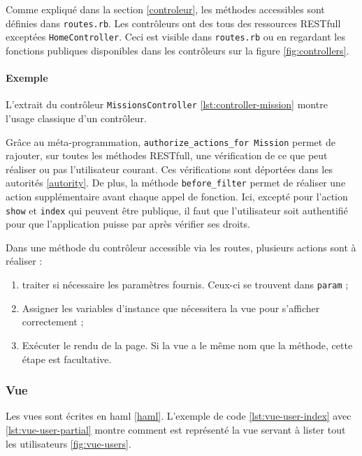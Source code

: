 Comme expliqué dans la section \ref{controleur}, les méthodes accessibles sont définies dans \texttt{routes.rb}. Les contrôleurs ont des tous des ressources RESTfull exceptées \texttt{HomeController}. Ceci est visible dans \texttt{routes.rb} ou en regardant les fonctions publiques disponibles dans les contrôleurs sur la figure \ref{fig:controllers}.

\paragraph{Exemple}
L'extrait du contrôleur \texttt{MissionsController} \ref{lst:controller-mission} montre l'usage classique d'un contrôleur. 


Grâce au méta-programmation, \lstinline[language=Rails]{authorize_actions_for Mission} permet de rajouter, sur toutes les méthodes RESTfull, une vérification de ce que peut réaliser ou pas l'utilisateur courant. Ces vérifications sont déportées dans les autorités \ref{autority}. De plus, la méthode \lstinline[language=Rails]{before_filter} permet de réaliser une action supplémentaire avant chaque appel de fonction. Ici, excepté pour l'action \texttt{show} et \texttt{index} qui peuvent être publique, il faut que l'utilisateur soit authentifié pour que l'application puisse par après vérifier ses droits. %

Dans une méthode du contrôleur accessible via les routes, plusieurs actions sont à réaliser :
\begin{enumerate}
  \item traiter si nécessaire les paramètres fournis. Ceux-ci se trouvent dans \lstinline[language=Rails]{param} ;
  \item Assigner les variables d'instance que nécessitera la vue pour s'afficher correctement ;
  \item Exécuter le rendu de la page. Si la vue a le même nom que la méthode, cette étape est facultative.
\end{enumerate}

\subsubsection{Vue}
\label{vues}
Les vues sont écrites en haml \ref{haml}. L'exemple de code \ref{lst:vue-user-index} avec \ref{lst:vue-user-partial} montre comment est représenté la vue servant à lister tout les utilisateurs \ref{fig:vue-users}.

